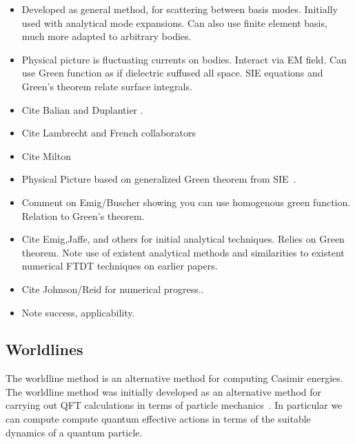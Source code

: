 \begin{itemize}
  \item Developed as general method, for scattering between basis modes.  
    Initially used with analytical mode expansions.  Can also use finite element basis,
    much more adapted to arbitrary bodies.  
\item Physical picture is fluctuating currents on bodies.  Interact via EM field.
  Can use Green function as if dielectric suffused all space.  
SIE equations and Green's theorem relate surface integrals.  
\end{itemize}


\begin{itemize}
\item Cite Balian and Duplantier \cite{Balian1977, Balian1978}.
\item Cite Lambrecht and French collaborators
  \cite{Lambrecht2006, MaiaNeto2008,Canaguier-Durand2012}
\item Cite Milton
\item Physical Picture based on generalized Green theorem from 
  SIE~\cite{Stratton1941}.
\item Comment on Emig/Buscher showing you can use homogenous green function.
  Relation to Green's theorem.
\item Cite Emig,Jaffe,  and others for initial analytical techniques.  Relies on Green theorem.
\cite{Emig2004, Emig2007, Rahi2009}
\cite{Kenneth2006}
  Note use of existent analytical methods and similarities to existent 
  numerical FTDT techniques on earlier papers.  
  \cite{Rodriguez2007,Rodriguez2007a, Rodriguez2009}
\item Cite Johnson/Reid for numerical progress.\cite{Reid2009,Reid2011, Reid2013}.
\item Note success, applicability.  
\end{itemize}

\subsection{Worldlines}

The worldline method is an alternative method for computing Casimir energies.
  The worldline method was initially developed as an alternative method for 
carrying out QFT calculations in terms of particle 
mechanics~\cite{McKeon1993, Strassler1992,Schubert2001}.
  In particular we can compute compute quantum effective actions in terms of
 the suitable dynamics of a quantum particle.

